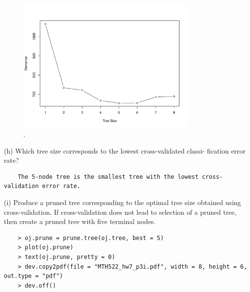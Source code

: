 \documentclass{article}
\begin{document}
\begin{figure}[htb]
	\begin{center}
		\includegraphics[width=0.8\textwidth]{MTH522_hw7_p3g.pdf}
	\end{center}
	\caption{.}
	\label{fig:MTH522_hw7_p3g}
\end{figure}




(h) Which tree size corresponds to the lowest cross-validated classi- fication error rate?\\

\begin{program}
	\begin{verbatim}
	The 5-node tree is the smallest tree with the lowest cross-validation error rate.
	\end{verbatim}
\end{program}


\newpage


(i) Produce a pruned tree corresponding to the optimal tree size obtained using cross-validation. If cross-validation does not lead to selection of a pruned tree, then create a pruned tree with five terminal nodes.\\

\begin{program}
	\begin{verbatim}
	> oj.prune = prune.tree(oj.tree, best = 5)
	> plot(oj.prune)
	> text(oj.prune, pretty = 0)
	> dev.copy2pdf(file = "MTH522_hw7_p3i.pdf", width = 8, height = 6, out.type = "pdf")
	> dev.off()
	\end{verbatim}
\end{program}
\end{document}
